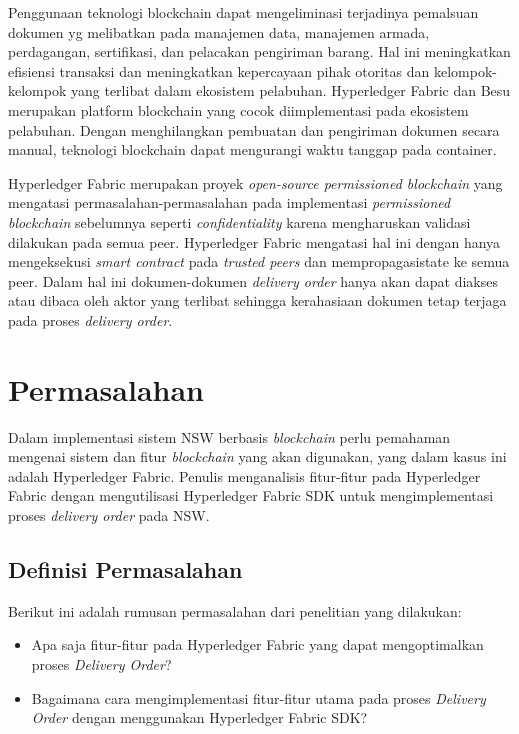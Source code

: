 Penggunaan teknologi blockchain dapat mengeliminasi terjadinya pemalsuan dokumen yg melibatkan pada manajemen data, manajemen armada,
perdagangan, sertifikasi, dan pelacakan pengiriman barang. Hal ini meningkatkan efisiensi transaksi dan meningkatkan kepercayaan pihak otoritas
dan kelompok-kelompok yang terlibat dalam ekosistem pelabuhan. Hyperledger Fabric dan Besu merupakan platform blockchain yang cocok
diimplementasi pada ekosistem pelabuhan. Dengan menghilangkan pembuatan dan pengiriman dokumen secara manual, teknologi blockchain dapat
mengurangi waktu tanggap pada container.

Hyperledger Fabric merupakan proyek \textit{open-source permissioned blockchain} yang mengatasi permasalahan-permasalahan pada implementasi
\textit{permissioned blockchain} sebelumnya seperti \textit{confidentiality} karena mengharuskan validasi dilakukan pada semua peer. Hyperledger Fabric
mengatasi hal ini dengan hanya mengeksekusi \textit{smart contract} pada \textit{trusted peers} dan mempropagasistate ke semua peer. Dalam hal ini dokumen-dokumen \textit{delivery order} hanya akan dapat diakses atau dibaca oleh aktor yang terlibat sehingga kerahasiaan dokumen tetap terjaga pada proses \textit{delivery order}.

\section{Permasalahan}
\label{sec:masalah}

Dalam implementasi sistem NSW berbasis \textit{blockchain} perlu pemahaman mengenai sistem dan fitur \textit{blockchain} yang akan digunakan, yang dalam kasus ini adalah Hyperledger Fabric. Penulis menganalisis fitur-fitur pada Hyperledger Fabric dengan mengutilisasi Hyperledger Fabric SDK untuk mengimplementasi proses \textit{delivery order} pada NSW. 


\subsection{Definisi Permasalahan}
\label{sec:definisiMasalah}
Berikut ini adalah rumusan permasalahan dari penelitian yang dilakukan:
\begin{itemize}
	\item Apa saja fitur-fitur pada Hyperledger Fabric yang dapat mengoptimalkan proses \textit{Delivery Order}?
	\item Bagaimana cara mengimplementasi fitur-fitur utama pada proses \textit{Delivery Order} dengan menggunakan Hyperledger Fabric SDK?
\end{itemize}

